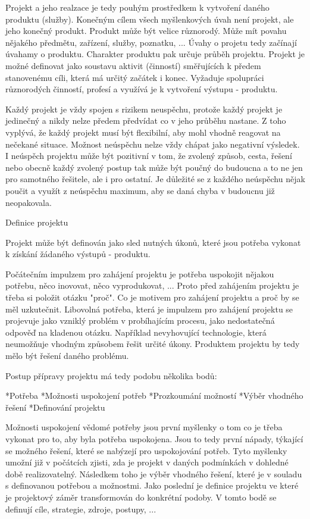 Projekt a jeho realzace je tedy pouhým prostředkem k vytvoření daného produktu (služby). Konečným cílem všech myšlenkových úvah není projekt, ale jeho konečný produkt. Produkt může být velice různorodý. Může mít povahu nějakého předmětu, zařízení, služby, poznatku, ... Úvahy o projetu tedy začínají úvahamy o produktu. Charakter produktu pak určuje průběh projektu. Projekt je možné definovat jako soustavu aktivit (činností) směřujících k předem stanovenému cíli, která má určitý začátek i konec. Vyžaduje spolupráci různorodých činností, profesí a využívá je k vytvoření výstupu - produktu.

Každý projekt je vždy spojen s rizikem neuspěchu, protože každý projekt je jedinečný a nikdy nelze předem předvídat co v jeho průběhu nastane. Z toho vyplývá, že každý projekt musí být flexibilní, aby mohl vhodně reagovat na nečekané situace. Možnost neúspěchu nelze vždy chápat jako negativní výsledek. I neúspěch projektu může být pozitivní v tom, že zvolený způsob, cesta, řešení nebo obecně každý zvolený postup tak může být poučný do budoucna a to ne jen pro samotného řešitele, ale i pro ostatní. Je důležité se z každého neúspěchu nějak poučit a využít z neúspěchu maximum, aby se daná chyba v budoucnu již neopakovala. 

\sec Definice projektu

Projekt může být definován jako sled nutných úkonů, které jsou potřeba vykonat k získání žádaného výstupů - produktu.

Počátečním impulzem pro zahájení projektu je potřeba uspokojit nějakou potřebu, něco inovovat, něco vyprodukovat, ... Proto před zahájením projektu je třeba si položit otázku "proč". Co je motivem pro zahájení projektu a proč by se měl uzkutečnit. Libovolná potřeba, která je impulzem pro zahájení projektu se projevuje jako vzniklý problém v probíhajícím procesu, jako nedostatečná odpověď na kladenou otázku. Například nevyhovující technologie, která neumožňuje vhodným způsobem řešit určité úkony. Produktem projektu by tedy mělo být řešení daného problému. 

Postup přípravy projektu má tedy podobu několika bodů:

\begitems
*Potřeba
*Možnosti uspokojení potřeb
*Prozkoumání možností
*Výběr vhodného řešení
*Definování projektu
\enditems

Možnosti uspokojení vědomé potřeby jsou první myšlenky o tom co je třeba vykonat pro to, aby byla potřeba uspokojena. Jsou to tedy první nápady, týkající se možného řešení, které se nabýzejí pro uspokojování potřeb. Tyto myšlenky umožní již v počátcích zjisti, zda je projekt v daných podmínkách v dohledné době realizovatelný. Následkem toho je výběr vhodného řešení, které je v souladu s definovanou potřebou a možnostmi. Jako poslední je definice projektu ve které je projektový záměr transformován do konkrétní podoby. V tomto bodě se definují cíle, strategie, zdroje, postupy, ...

